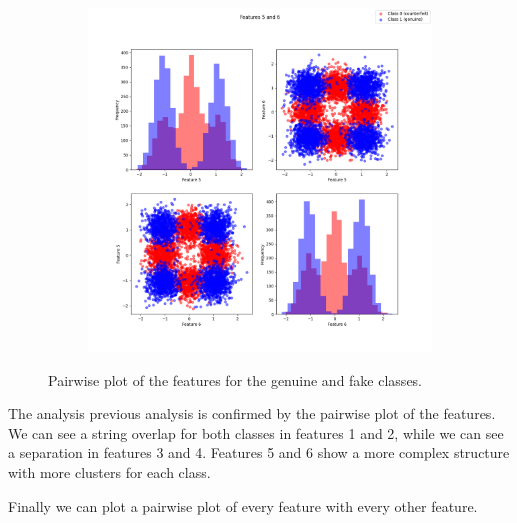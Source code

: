 \documentclass[12pt]{report}
\newcommand{\nnl}{%
    \newline
    \newline
}
\begin{document}
\begin{figure}[H]
\begin{subfigure}[t]{0.33\textwidth}
    \end{subfigure}
    \begin{subfigure}[t]{0.32\textwidth}
        \includegraphics[width=\textwidth]{./plot/features/features_5_6.png}
    \end{subfigure}
    \caption{Pairwise plot of the features for the genuine and fake classes.}
    \label{fig:pairwise_plot}
\end{figure}
\noindent
The analysis previous analysis is confirmed by the pairwise plot of the features. We can see a string overlap for both classes in features 1 and 2, while we can see a separation in features 3 and 4. Features 5 and 6 show a more complex structure with more clusters for each class.
\nnl
Finally we can plot a pairwise plot of every feature with every other feature.
\end{document}
